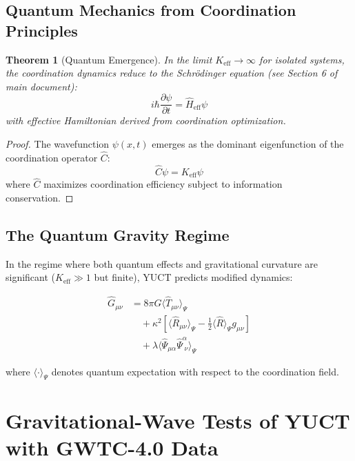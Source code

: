 \documentclass[12pt,a4paper]{article}
\newcommand{\eff}{\text{eff}}               %
\newtheorem{theorem}{Theorem}[section]
\theoremstyle{remark}
\newcommand{\Keff}{K_{\mathrm{eff}}}
\begin{document}
	\subsection{Quantum Mechanics from Coordination Principles}
	
	\begin{theorem}[Quantum Emergence]
		In the limit $\Keff \to \infty$ for isolated systems, the coordination dynamics reduce to the Schrödinger equation (see Section 6 of main document):
		\[
		i\hbar \frac{\partial \psi}{\partial t} = \hat{H}_{\eff} \psi
		\]
		with effective Hamiltonian derived from coordination optimization.
	\end{theorem}
	
	\begin{proof}
		The wavefunction $\psi(x,t)$ emerges as the dominant eigenfunction of the coordination operator $\hat{C}$:
		\[
		\hat{C} \psi = \Keff \psi
		\]
		where $\hat{C}$ maximizes coordination efficiency subject to information conservation.
	\end{proof}
	
	\subsection{The Quantum Gravity Regime}
	
	In the regime where both quantum effects and gravitational curvature are significant ($\Keff \gg 1$ but finite), YUCT predicts modified dynamics:
	
	\begin{equation}
		\begin{aligned}
			\hat{G}_{\mu\nu} &= 8\pi G \langle \hat{T}_{\mu\nu} \rangle_{\Psi} \\
			&\quad + \kappa^2 \left[ \langle \hat{R}_{\mu\nu} \rangle_{\Psi} - \frac{1}{2} \langle \hat{R} \rangle_{\Psi} g_{\mu\nu} \right] \\
			&\quad + \lambda \langle \hat{\Psi}_{\mu\alpha} \hat{\Psi}^{\alpha}_{\;\nu} \rangle_{\Psi}
		\end{aligned}
	\end{equation}
	
	where $\langle \cdot \rangle_{\Psi}$ denotes quantum expectation with respect to the coordination field.
	
	\section{Gravitational-Wave Tests of YUCT with GWTC-4.0 Data}
	\label{sec:gw-tests}
	
\end{document}
